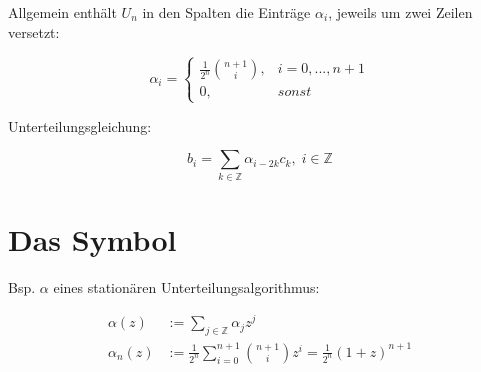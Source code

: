 \documentclass[8pt, DIV15, twocolumn]{scrartcl}
\begin{document}
Allgemein enthält $U_n$ in den Spalten die Einträge $\alpha_i$, jeweils um zwei Zeilen versetzt:

\begin{equation*}
\alpha_i = \begin{cases}
        \frac{1}{2^n} \binom{n+1}{i}, & i = 0, ..., n+1\\
        0, & sonst
        \end{cases}
\end{equation*}

Unterteilungsgleichung:

\begin{equation*}
b_i = \sum\limits_{k\in \mathbb{Z}} \alpha_{i-2k} c_k, \; i\in \mathbb{Z}
\end{equation*}


\section*{Das Symbol}
Bsp. $\alpha$ eines stationären Unterteilungsalgorithmus:

\begin{equation*}
\begin{aligned}
\alpha \left( z \right) &:= \sum\limits_{j\in\mathbb{Z}} \alpha_j z^j \\
\alpha_n \left( z \right) &:= \frac{1}{2^n} \sum\limits_{i=0}^{n+1} \binom{n+1}{i} z^i = \frac{1}{2^n} \left( 1 + z \right)^{n+1}
\end{aligned}
\end{equation*}
\end{document}
